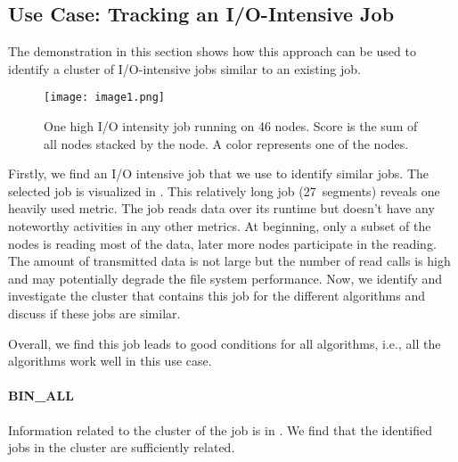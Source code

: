 \documentclass{jhps}
\begin{document}
\subsection{Use Case: Tracking an I/O-Intensive Job}
The demonstration in this section shows how this approach can be used to identify a cluster of I/O-intensive jobs similar to an existing job.

\begin{figure}
  \centering
  \texttt{[image: image1.png]}
  \caption{One high I/O intensity job running on 46 nodes.
Score is the sum of all nodes stacked by the node.
A color represents one of the nodes.}
  \label{fig:use_case}
\end{figure}

Firstly, we find an I/O intensive job that we use to identify similar jobs.
The selected job is visualized in .
This relatively long job (27~segments) reveals one heavily used metric.
The job reads data over its runtime but doesn't have any noteworthy activities in any other metrics.
At beginning, only a subset of the nodes is reading most of the data, later more nodes participate in the reading.
The amount of transmitted data is not large but the number of read calls is high and may potentially degrade the file system performance.
Now, we identify and investigate the cluster that contains this job for the different algorithms and discuss if these jobs are similar.

Overall, we find this job leads to good conditions for all algorithms, i.e., all the algorithms work well in this use case.

\paragraph{BIN\_ALL}
Information related to the cluster of the job is in .
We find that the identified jobs in the cluster are sufficiently related.
\end{document}
